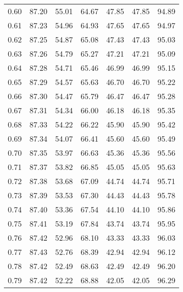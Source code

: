 \begin{tabular}{|c|c|c|c|c|c|c|}
      0.60 &     87.20 &     55.01 &      64.67 &   47.85 &      47.85 &         94.89 \\
      0.61 &     87.23 &     54.96 &      64.93 &   47.65 &      47.65 &         94.97 \\
      0.62 &     87.25 &     54.87 &      65.08 &   47.43 &      47.43 &         95.03 \\
      0.63 &     87.26 &     54.79 &      65.27 &   47.21 &      47.21 &         95.09 \\
      0.64 &     87.28 &     54.71 &      65.46 &   46.99 &      46.99 &         95.15 \\
      0.65 &     87.29 &     54.57 &      65.63 &   46.70 &      46.70 &         95.22 \\
      0.66 &     87.30 &     54.47 &      65.79 &   46.47 &      46.47 &         95.28 \\
      0.67 &     87.31 &     54.34 &      66.00 &   46.18 &      46.18 &         95.35 \\
      0.68 &     87.33 &     54.22 &      66.22 &   45.90 &      45.90 &         95.42 \\
      0.69 &     87.34 &     54.07 &      66.41 &   45.60 &      45.60 &         95.49 \\
      0.70 &     87.35 &     53.97 &      66.63 &   45.36 &      45.36 &         95.56 \\
      0.71 &     87.37 &     53.82 &      66.85 &   45.05 &      45.05 &         95.63 \\
      0.72 &     87.38 &     53.68 &      67.09 &   44.74 &      44.74 &         95.71 \\
      0.73 &     87.39 &     53.53 &      67.30 &   44.43 &      44.43 &         95.78 \\
      0.74 &     87.40 &     53.36 &      67.54 &   44.10 &      44.10 &         95.86 \\
      0.75 &     87.41 &     53.19 &      67.84 &   43.74 &      43.74 &         95.95 \\
      0.76 &     87.42 &     52.96 &      68.10 &   43.33 &      43.33 &         96.03 \\
      0.77 &     87.43 &     52.76 &      68.39 &   42.94 &      42.94 &         96.12 \\
      0.78 &     87.42 &     52.49 &      68.63 &   42.49 &      42.49 &         96.20 \\
      0.79 &     87.42 &     52.22 &      68.88 &   42.05 &      42.05 &         96.29 \\

\end{tabular}
